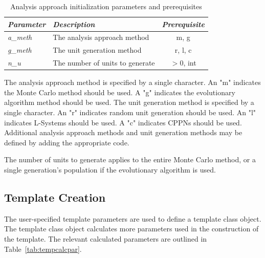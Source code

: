 \begin{table}[H]
\centering
\caption{Analysis approach initialization parameters and prerequisites}
\label{tab:analpar}
\begin{tabular}{@{}llc@{}}
\toprule
\textit{\textbf{Parameter}} & \textit{\textbf{Description}} & \multicolumn{1}{l}{\textit{\textbf{Prerequisite}}} \\ \midrule
\textit{a\_meth} & The analysis approach method    & m, g      \\
\textit{g\_meth} & The unit generation method      & r, l, c   \\
\textit{n\_u}    & The number of units to generate & $>0$, int \\ \bottomrule
\end{tabular}
\end{table}

The analysis approach method is specified by a single character. An "m" indicates the Monte Carlo method should be used. A "g" indicates the evolutionary algorithm method should be used. The unit generation method is specified by a single character. An "r" indicates random unit generation should be used. An "l" indicates L-Systems should be used. A "c" indicates CPPNs should be used. Additional analysis approach methods and unit generation methods may be defined by adding the appropriate code.

The number of units to generate applies to the entire Monte Carlo method, or a single generation's population if the evolutionary algorithm is used.

\subsection{Template Creation}
\label{ssec:tempcr}

The user-specified template parameters are used to define a template class object. The template class object calculates more parameters used in the construction of the template. The relevant calculated parameters are outlined in Table~\ref{tab:tempcalcpar}.

